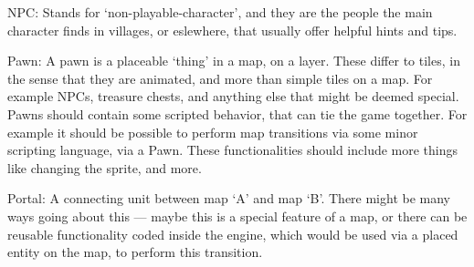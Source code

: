 \begin{description}
\item {NPC}: Stands for `non-playable-character', and they are the people the
  main character finds in villages, or eslewhere, that usually offer helpful
  hints and tips.

\item {Pawn}: A pawn is a placeable `thing' in a map, on a layer. These differ
  to tiles, in the sense that they are animated, and more than simple tiles on a
  map. For example NPCs, treasure chests, and anything else that might be deemed
  special. Pawns should contain some scripted behavior, that can tie the game
  together. For example it should be possible to perform map transitions via
  some minor scripting language, via a Pawn. These functionalities should
  include more things like changing the sprite, and more.

\item {Portal}: A connecting unit between map `A' and map `B'. There might be
  many ways going about this --- maybe this is a special feature of a map, or
  there can be reusable functionality coded inside the engine, which would be
  used via a placed entity on the map, to perform this transition.


\end{description}

